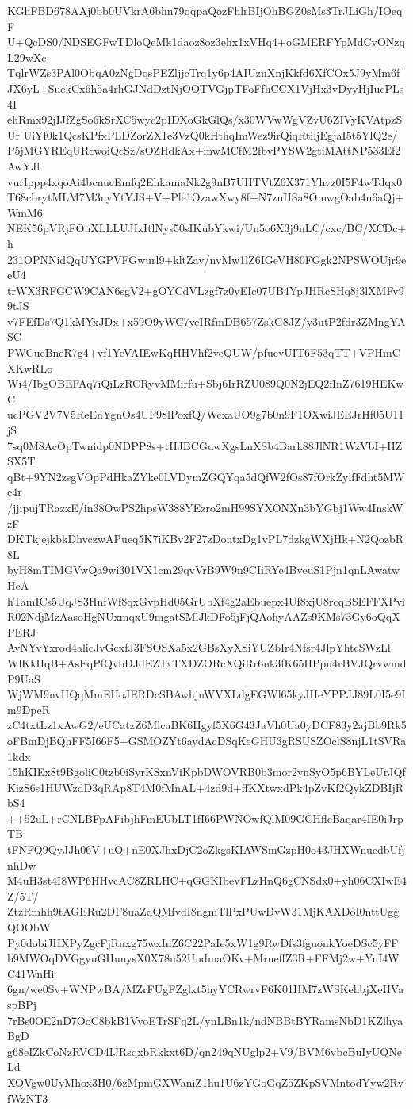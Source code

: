 KGhFBD678AAj0bb0UVkrA6bhn79qqpaQozFhlrBIjOhBGZ0sMs3TrJLiGh/IOeqF
U+QcDS0/NDSEGFwTDloQeMk1daoz8oz3ehx1xVHq4+oGMERFYpMdCvONzqL29wXc
TqlrWZs3PAl0ObqA0zNgDqsPEZljjcTrq1y6p4AIUznXnjKkfd6XfCOx5J9yMm6f
JX6yL+SuekCx6h5a4rhGJNdDztNjOQTVGjpTFoFfhCCX1VjHx3vDyyHjIucPLs4I
ehRmx92jIJfZgSo6kSrXC5wyc2pIDXoGkGlQs/x30WVwWgVZvU6ZIVyKVAtpzSUr
UiYf0k1QcsKPfxPLDZorZX1e3VzQ0kHthqImWez9irQiqRtiljEgjaI5t5YlQ2e/
P5jMGYREqURcwoiQcSz/sOZHdkAx+mwMCfM2fbvPYSW2gtiMAttNP533Ef2AwYJl
vurIppp4xqoAi4bcnucEmfq2EhkamaNk2g9nB7UHTVtZ6X371Yhvz0I5F4wTdqx0
T68cbrytMLM7M3nyYtYJS+V+Ple1OzawXwy8f+N7zuHSa8OmwgOab4n6aQj+WmM6
NEK56pVRjFOuXLLLUJIxItlNys50sIKubYkwi/Un5o6X3j9nLC/cxc/BC/XCDc+h
231OPNNidQqUYGPVFGwurl9+kltZav/nvMw1lZ6IGeVH80FGgk2NPSWOUjr9eeU4
trWX3RFGCW9CAN6sgV2+gOYCdVLzgf7z0yEIc07UB4YpJHRcSHq8j3lXMFv99tJS
v7FEfDs7Q1kMYxJDx+x59O9yWC7yeIRfmDB657ZskG8JZ/y3utP2fdr3ZMngYASC
PWCueBneR7g4+vf1YeVAIEwKqHHVhf2veQUW/pfucvUIT6F53qTT+VPHmCXKwRLo
Wi4/IbgOBEFAq7iQiLzRCRyvMMirfu+Sbj6IrRZU089Q0N2jEQ2iInZ7619HEKwC
ucPGV2V7V5ReEnYgnOs4UF98lPoxfQ/WcxaUO9g7b0n9F1OXwiJEEJrHf05U11jS
7sq0M8AcOpTwnidp0NDPP8s+tHJBCGuwXgsLnXSb4Bark88JlNR1WzVbI+HZSX5T
qBt+9YN2zsgVOpPdHkaZYke0LVDymZGQYqa5dQfW2fOs87fOrkZylfFdht5MWc4r
/jjipujTRazxE/in38OwPS2hpsW388YEzro2mH99SYXONXn3bYGbj1Ww4InskWzF
DKTkjejkbkDhvczwAPueq5K7iKBv2F27zDontxDg1vPL7dzkgWXjHk+N2QozbR8L
byH8mTIMGVwQa9wi301VX1cm29qvVrB9W9n9CIiRYe4BveuS1Pjn1qnLAwatwHcA
hTamICs5UqJS3HnfWf8qxGvpHd05GrUbXf4g2aEbuepx4Uf8xjU8rcqBSEFFXPvi
R02NdjMzAasoHgNUxmqxU9mgatSMlJkDFo5jFjQAohyAAZs9KMs73Gy6oQqXPERJ
AvNYvYxrod4alicJvGcxfJ3FSOSXa5x2GBsXyXSiYUZbIr4Nfsr4JlpYhtcSWzLl
WlKkHqB+AsEqPfQvbDJdEZTxTXDZORcXQiRr6nk3fK65HPpu4rBVJQrvwmdP9UaS
WjWM9nvHQqMmEHoJERDcSBAwhjnWVXLdgEGWl65kyJHeYPPJJ89L0I5e9Im9DpeR
zC4txtLz1xAwG2/eUCatzZ6MlcaBK6Hgyf5X6G43JaVh0Ua0yDCF83y2ajBb9Rk5
oFBmDjBQhFF5I66F5+GSMOZYt6aydAcDSqKeGHU3gRSUSZOclS8njL1tSVRa1kdx
15hKIEx8t9BgoliC0tzb0iSyrKSxnViKpbDWOVRB0b3mor2vnSyO5p6BYLeUrJQf
KizS6s1HUWzdD3qRAp8T4M0fMnAL+4zd9d+ffKXtwxdPk4pZvKf2QykZDBIjRbS4
++52uL+rCNLBFpAFibjhFmEUbLT1fI66PWNOwfQlM09GCHflcBaqar4IE0iJrpTB
tFNFQ9QyJJh06V+uQ+nE0XJhxDjC2oZkgsKIAWSmGzpH0o43JHXWnucdbUfjnhDw
M4uH3st4I8WP6HHvcAC8ZRLHC+qGGKIbevFLzHnQ6gCNSdx0+yh06CXIwE4Z/5T/
ZtzRmhh9tAGERu2DF8uaZdQMfvdI8ngmTlPxPUwDvW31MjKAXDoI0nttUggQOObW
Py0dobiJHXPyZgcFjRnxg75wxInZ6C22PaIe5xW1g9RwDfs3fguonkYoeDSc5yFF
b9MWOqDVGgyuGHunysX0X78u52UudmaOKv+MrueffZ3R+FFMj2w+YuI4WC41WnHi
6gn/we0Sv+WNPwBA/MZrFUgFZglxt5hyYCRwrvF6K01HM7zWSKehbjXeHVaspBPj
7rBs0OE2nD7OoC8bkB1VvoETrSFq2L/ynLBn1k/ndNBBtBYRamsNbD1KZlhyaBgD
g68eIZkCoNzRVCD4IJRsqxbRkkxt6D/qn249qNUglp2+V9/BVM6vbcBuIyUQNeLd
XQVgw0UyMhox3H0/6zMpmGXWaniZ1hu1U6zYGoGqZ5ZKpSVMntodYyw2RvfWzNT3
